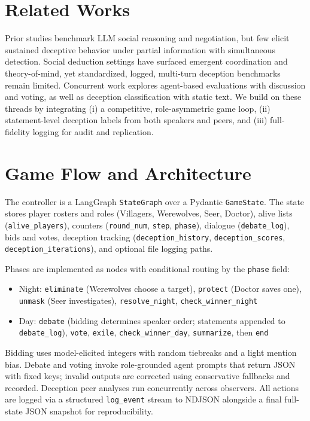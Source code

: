 \documentclass{article}
\begin{document}
\section{Related Works}
Prior studies benchmark LLM social reasoning and negotiation, but few elicit sustained deceptive behavior under partial information with simultaneous detection. Social deduction settings have surfaced emergent coordination and theory-of-mind, yet standardized, logged, multi-turn deception benchmarks remain limited. Concurrent work explores agent-based evaluations with discussion and voting, as well as deception classification with static text. We build on these threads by integrating (i) a competitive, role-asymmetric game loop, (ii) statement-level deception labels from both speakers and peers, and (iii) full-fidelity logging for audit and replication.


\section{Game Flow and Architecture}
The controller is a LangGraph \texttt{StateGraph} over a Pydantic \texttt{GameState}. The state stores player rosters and roles (Villagers, Werewolves, Seer, Doctor), alive lists (\texttt{alive\_players}), counters (\texttt{round\_num}, \texttt{step}, \texttt{phase}), dialogue (\texttt{debate\_log}), bids and votes, deception tracking (\texttt{deception\_history}, \texttt{deception\_scores}, \texttt{deception\_iterations}), and optional file logging paths.

Phases are implemented as nodes with conditional routing by the \texttt{phase} field:
\begin{itemize}
  \item Night: \texttt{eliminate} (Werewolves choose a target), \texttt{protect} (Doctor saves one), \texttt{unmask} (Seer investigates), \texttt{resolve\_night}, \texttt{check\_winner\_night}
  \item Day: \texttt{debate} (bidding determines speaker order; statements appended to \texttt{debate\_log}), \texttt{vote}, \texttt{exile}, \texttt{check\_winner\_day}, \texttt{summarize}, then \texttt{end}
\end{itemize}

Bidding uses model-elicited integers with random tiebreaks and a light mention bias. Debate and voting invoke role-grounded agent prompts that return JSON with fixed keys; invalid outputs are corrected using conservative fallbacks and recorded. Deception peer analyses run concurrently across observers. All actions are logged via a structured \texttt{log\_event} stream to NDJSON alongside a final full-state JSON snapshot for reproducibility.
\end{document}
